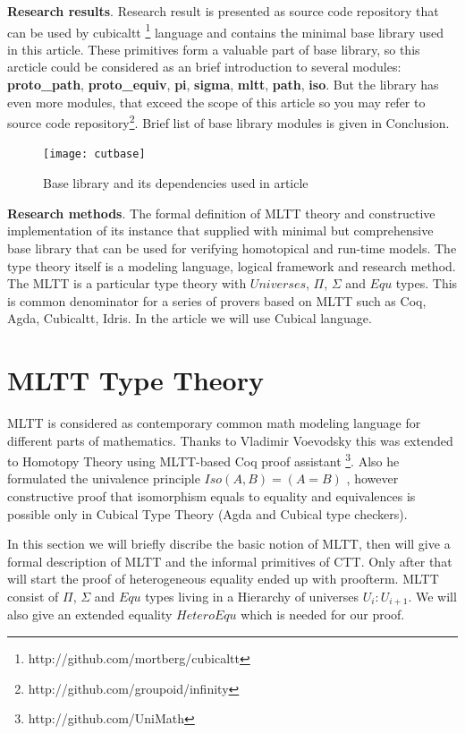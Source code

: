 \documentclass{article}
\begin{document}
{\bf Research results}. Research result is presented as source code repository that can be used by
cubicaltt \footnote{http://github.com/mortberg/cubicaltt} language and contains the minimal base library used in this article.
These primitives form a valuable part of base library, so this arcticle could be
considered as an brief introduction to several modules: {\bf proto\_path}, {\bf proto\_equiv}, {\bf pi},
{\bf sigma}, {\bf mltt}, {\bf path}, {\bf iso}. But the library has even more modules, that
exceed the scope of this article so you may refer to source code
repository\footnote{http://github.com/groupoid/infinity}. Brief list of base library modules is given
in Conclusion.

\begin{figure}[h]
  \centerline{\texttt{[image: cutbase]}}
  \caption{Base library and its dependencies used in article}
\end{figure}

{\bf Research methods}. The formal definition of MLTT theory and constructive
implementation of its instance that supplied with minimal but comprehensive base library that
can be used for verifying homotopical and run-time models. The type theory itself is a modeling
language, logical framework and research method. The MLTT is a particular type theory with
$Universes$, $\Pi$, $\Sigma$ and $Equ$ types. This is common denominator for a series of provers
based on MLTT such as Coq, Agda, Cubicaltt, Idris. In the article we will use Cubical language.

\section{MLTT Type Theory}

MLTT is considered as contemporary common math modeling language for different parts of mathematics.
Thanks to Vladimir Voevodsky this was extended to Homotopy Theory
using MLTT-based Coq proof assistant \footnote{http://github.com/UniMath}.
Also he formulated the univalence principle $Iso(A,B)=(A=B)$ \cite{HoTT},
however constructive proof that isomorphism equals to equality and equivalences is possible only
in Cubical Type Theory \cite{Mortberg17} (Agda and Cubical type checkers).

In this section we will briefly discribe the basic notion of MLTT, then will give a formal
description of MLTT and the informal primitives of CTT. Only after that will start
the proof of heterogeneous equality ended up with proofterm. MLTT consist of
$\Pi$, $\Sigma$ and $Equ$ types living in a Hierarchy of universes $U_i : U_{i+1}$. We will
also give an extended equality $HeteroEqu$ which is needed for our proof.
\end{document}
